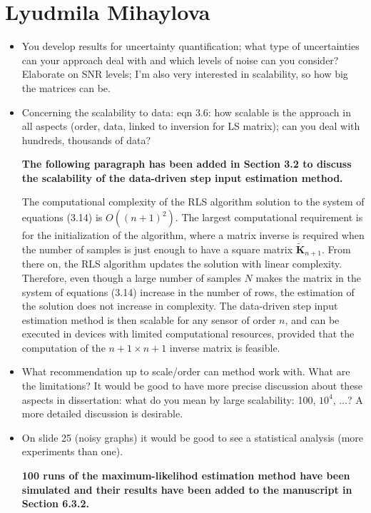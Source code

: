 \documentclass[11pt]{article}
\begin{document}
\section*{Lyudmila Mihaylova}

\begin{itemize}
	\item You develop results for uncertainty quantification; what type of uncertainties  can your approach deal with and which levels of noise can you consider? Elaborate on SNR levels; I’m also very interested in scalability, so how big the matrices can be.
	\item  Concerning the scalability to data: eqn 3.6: how scalable is the approach in all aspects (order, data, linked to inversion for LS matrix); can you deal with hundreds, thousands of data?
	
	{\bfseries The following paragraph has been added in Section 3.2 to discuss the scalability of the data-driven step input estimation method.}
	
	\color{blue}
    The computational complexity of the RLS algorithm solution to the system of equations (3.14) is $O \left( \left( n+1 \right)^2 \right)$.
    The largest computational requirement is for the initialization of the algorithm, where a matrix inverse is required when the number of samples is just enough to have a square matrix $\widetilde{\mathbf{K}}_{n+1}$.
    From there on, the RLS algorithm updates the solution with linear complexity.
    Therefore, even though a large number of samples $N$ makes the matrix in the system of equations (3.14) increase in the number of rows, the estimation of the solution does not increase in complexity. 
    The data-driven step input estimation method is then scalable for any sensor of order $n$, and can be executed in devices with limited computational resources, provided that the computation of the  $n+1 \times n+1$ inverse matrix is feasible.
    \color{black}	

	
	\item  What recommendation up to scale/order can method work with. What are the limitations? It would be good to have more precise discussion about these aspects in dissertation: what do you mean by large scalability: 100, $10^4$, ...? A more detailed discussion is desirable.
	\item  On slide 25 (noisy graphs) it would be good to see a statistical analysis (more experiments than one).
	
    {\bfseries 100 runs of the maximum-likelihod estimation method have been simulated and their results have been added to the manuscript in Section 6.3.2.}
	

\end{itemize}
\end{document}
